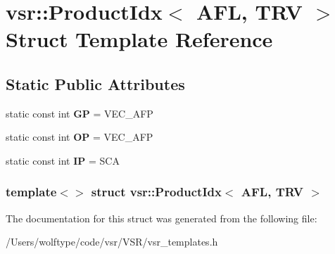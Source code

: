 \hypertarget{structvsr_1_1_product_idx_3_01_a_f_l_00_01_t_r_v_01_4}{\section{vsr\-:\-:Product\-Idx$<$ A\-F\-L, T\-R\-V $>$ Struct Template Reference}
\label{structvsr_1_1_product_idx_3_01_a_f_l_00_01_t_r_v_01_4}
}
\subsection*{Static Public Attributes}
\begin{DoxyCompactItemize}
\item 
\hypertarget{structvsr_1_1_product_idx_3_01_a_f_l_00_01_t_r_v_01_4_a28118e5795a3e88b460ea70a77704688}{static const int {\bfseries G\-P} = V\-E\-C\-\_\-\-A\-F\-P}\label{structvsr_1_1_product_idx_3_01_a_f_l_00_01_t_r_v_01_4_a28118e5795a3e88b460ea70a77704688}

\item 
\hypertarget{structvsr_1_1_product_idx_3_01_a_f_l_00_01_t_r_v_01_4_ad5d4f64466739d3cc9cda034f57d2aa8}{static const int {\bfseries O\-P} = V\-E\-C\-\_\-\-A\-F\-P}\label{structvsr_1_1_product_idx_3_01_a_f_l_00_01_t_r_v_01_4_ad5d4f64466739d3cc9cda034f57d2aa8}

\item 
\hypertarget{structvsr_1_1_product_idx_3_01_a_f_l_00_01_t_r_v_01_4_a69437e412acf59b90f711040f0ecada0}{static const int {\bfseries I\-P} = S\-C\-A}\label{structvsr_1_1_product_idx_3_01_a_f_l_00_01_t_r_v_01_4_a69437e412acf59b90f711040f0ecada0}

\end{DoxyCompactItemize}
\subsubsection*{template$<$$>$ struct vsr\-::\-Product\-Idx$<$ A\-F\-L, T\-R\-V $>$}



The documentation for this struct was generated from the following file\-:\begin{DoxyCompactItemize}
\item 
/\-Users/wolftype/code/vsr/\-V\-S\-R/vsr\-\_\-templates.\-h\end{DoxyCompactItemize}

